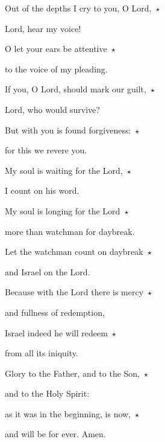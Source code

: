 \noindent Out of the depths I cry to you, O Lord,~$\star$~\nopagebreak

Lord, hear my voice!

\noindent O let your ears be attentive~$\star$~\nopagebreak

to the voice of my pleading.

\noindent If you, O Lord, should mark our guilt,~$\star$~\nopagebreak

Lord, who would survive?

\noindent But with you is found forgiveness:~$\star$~\nopagebreak

for this we revere you.

\noindent My soul is waiting for the Lord,~$\star$~\nopagebreak

I count on his word.

\noindent My soul is longing for the Lord~$\star$~\nopagebreak

more than watchman for daybreak.

\noindent Let the watchman count on daybreak~$\star$~\nopagebreak

and Israel on the Lord.

\noindent Because with the Lord there is mercy~$\star$~\nopagebreak

and fullness of redemption,

\noindent Israel indeed he will redeem~$\star$~\nopagebreak

from all its iniquity.

\noindent Glory to the Father, and to the Son,~$\star$~\nopagebreak

and to the Holy Spirit:

\noindent as it was in the beginning, is now,~$\star$~\nopagebreak

and will be for ever. Amen.